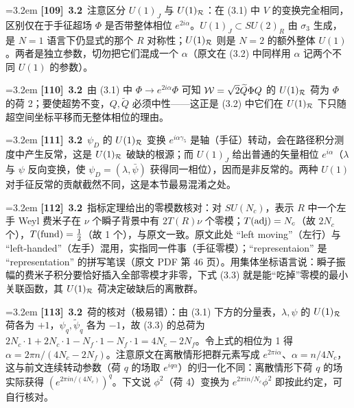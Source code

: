 \par
\par\medskip\noindent\hangindent=3.2em \textbf{[109]}~\textbf{3.2}~注意区分 $U(1)_J$ 与 $U(1)_{\cal R}$：在 (3.1) 中 $V$ 的变换完全相同，区别仅在于手征超场 $\Phi$ 是否带整体相位 $e^{2i\alpha}$。$U(1)_J\subset SU(2)_R$ 由 $\sigma_3$ 生成，是 $N=1$ 语言下仍显式的那个 $R$ 对称性；$U(1)_{\cal R}$ 则是 $N=2$ 的额外整体 $U(1)$。两者是独立参数，切勿把它们混成一个 $\alpha$（原文在 (3.2) 中同样用 $\alpha$ 记两个不同 $U(1)$ 的参数）。
\par
\par\medskip\noindent\hangindent=3.2em \textbf{[110]}~\textbf{3.2}~由 (3.1) 中 $\Phi\to e^{2i\alpha}\Phi$ 可知 ${\cal W}=\sqrt{2}\widetilde Q\Phi Q$ 的 $U(1)_{\cal R}$ 荷为 $\Phi$ 的荷 2；要使超势不变，$Q,\widetilde Q$ 必须中性——这正是 (3.2) 中它们在 $U(1)_{\cal R}$ 下只随超空间坐标平移而无整体相位的理由。
\par
\par\medskip\noindent\hangindent=3.2em \textbf{[111]}~\textbf{3.2}~$\psi_D$ 的 $U(1)_{\cal R}$ 变换 $e^{i\alpha\gamma_5}$ 是轴（手征）转动，会在路径积分测度中产生反常，这是 $U(1)_{\cal R}$ 破缺的根源；而 $U(1)_J$ 给出普通的矢量相位 $e^{i\alpha}$（$\lambda$ 与 $\psi$ 反向变换，使 $\psi_D=(\lambda,\bar\psi)$ 获得同一相位），因而是非反常的。两种 $U(1)$ 对手征反常的贡献截然不同，这是本节最易混淆之处。
\par
\par\medskip\noindent\hangindent=3.2em \textbf{[112]}~\textbf{3.2}~指标定理给出的零模数核对：对 $SU(N_c)$，表示 $R$ 中一个左手 Weyl 费米子在 $\nu$ 个瞬子背景中有 $2T(R)\nu$ 个零模；$T({\rm adj})=N_c$（故 $2N_c$ 个），$T({\rm fund})={1\over2}$（故 1 个），与原文一致。原文此处 “left moving”（左行）与 “left-handed”（左手）混用，实指同一件事（手征零模）；“representaion” 是 “representation” 的拼写笔误（原文 PDF 第 46 页）。用集体坐标语言说：瞬子振幅的费米子积分要恰好插入全部零模才非零，下式 (3.3) 就是能“吃掉”零模的最小关联函数，其 $U(1)_{\cal R}$ 荷决定破缺后的离散群。
\par
\par\medskip\noindent\hangindent=3.2em \textbf{[113]}~\textbf{3.2}~荷的核对（极易错）：由 (3.1) 下方的分量表，$\lambda,\psi$ 的 $U(1)_{\cal R}$ 荷各为 $+1$，$\psi_q,\widetilde\psi_q$ 各为 $-1$，故 (3.3) 的总荷为 $2N_c\cdot1+2N_c\cdot1-N_f\cdot1-N_f\cdot1=4N_c-2N_f$。令上式的相位为 1 得 $\alpha=2\pi n/(4N_c-2N_f)$。注意原文在离散情形把群元素写成 $e^{2\pi i\alpha}$、$\alpha=n/4N_c$，这与前文连续转动参数（荷 $q$ 的场取 $e^{iq\alpha}$）的归一化不同：离散情形下荷 $q$ 的场实际获得 $(e^{2\pi in/(4N_c)})^q$。下文说 $\phi^2$（荷 4）变换为 $e^{2\pi in/N_c}\phi^2$ 即按此约定，可自行核对。
